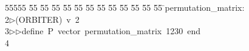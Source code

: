 %
%
\begin{tabbing}
55555 \= 55 \= 55 \= 55 \= 55 \= 55 \= 55 \= 55 \= 55 \= 55 \= 55 \= 55 \= 55 \= \>permutation\_matrix:\\[0pt]
2\>$\triangleright$\>(ORBITER)\ v\ 2\ \\[0pt]
3\>$\triangleright$\>$\triangleright$\>define\ P\ vector\ permutation\_matrix\ 1230\ end\ \\[0pt]
4\>\end{tabbing}
